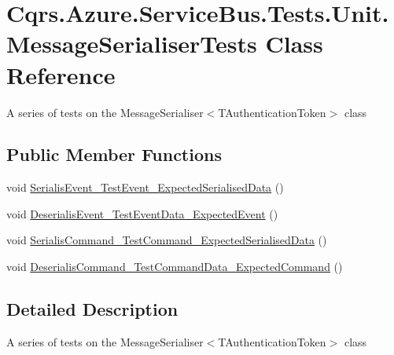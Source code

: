 \hypertarget{classCqrs_1_1Azure_1_1ServiceBus_1_1Tests_1_1Unit_1_1MessageSerialiserTests}{}\section{Cqrs.\+Azure.\+Service\+Bus.\+Tests.\+Unit.\+Message\+Serialiser\+Tests Class Reference}
\label{classCqrs_1_1Azure_1_1ServiceBus_1_1Tests_1_1Unit_1_1MessageSerialiserTests}


A series of tests on the Message\+Serialiser$<$\+T\+Authentication\+Token$>$ class  


\subsection*{Public Member Functions}
\begin{DoxyCompactItemize}
\item 
void \hyperlink{classCqrs_1_1Azure_1_1ServiceBus_1_1Tests_1_1Unit_1_1MessageSerialiserTests_a09435e682cbb0ae4005a037bfe127818_a09435e682cbb0ae4005a037bfe127818}{Serialis\+Event\+\_\+\+Test\+Event\+\_\+\+Expected\+Serialised\+Data} ()
\item 
void \hyperlink{classCqrs_1_1Azure_1_1ServiceBus_1_1Tests_1_1Unit_1_1MessageSerialiserTests_a8ef48324f71f7ee85bffb8bd4b5d0547_a8ef48324f71f7ee85bffb8bd4b5d0547}{Deserialis\+Event\+\_\+\+Test\+Event\+Data\+\_\+\+Expected\+Event} ()
\item 
void \hyperlink{classCqrs_1_1Azure_1_1ServiceBus_1_1Tests_1_1Unit_1_1MessageSerialiserTests_a5d7c6251b114016dc7ffdf8c35421486_a5d7c6251b114016dc7ffdf8c35421486}{Serialis\+Command\+\_\+\+Test\+Command\+\_\+\+Expected\+Serialised\+Data} ()
\item 
void \hyperlink{classCqrs_1_1Azure_1_1ServiceBus_1_1Tests_1_1Unit_1_1MessageSerialiserTests_ac923a4ad184f57b8cc21532ba661a370_ac923a4ad184f57b8cc21532ba661a370}{Deserialis\+Command\+\_\+\+Test\+Command\+Data\+\_\+\+Expected\+Command} ()
\end{DoxyCompactItemize}


\subsection{Detailed Description}
A series of tests on the Message\+Serialiser$<$\+T\+Authentication\+Token$>$ class 



